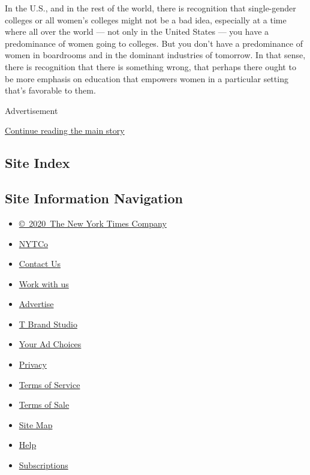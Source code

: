 In the U.S., and in the rest of the world, there is recognition that
single-gender colleges or all women's colleges might not be a bad idea,
especially at a time where all over the world --- not only in the United
States --- you have a predominance of women going to colleges. But you
don't have a predominance of women in boardrooms and in the dominant
industries of tomorrow. In that sense, there is recognition that there
is something wrong, that perhaps there ought to be more emphasis on
education that empowers women in a particular setting that's favorable
to them.

Advertisement

\protect\hyperlink{after-bottom}{Continue reading the main story}

\hypertarget{site-index}{%
\subsection{Site Index}\label{site-index}}

\hypertarget{site-information-navigation}{%
\subsection{Site Information
Navigation}\label{site-information-navigation}}

\begin{itemize}
\tightlist
\item
  \href{https://help.nytimes3xbfgragh.onion/hc/en-us/articles/115014792127-Copyright-notice}{©~2020~The
  New York Times Company}
\end{itemize}

\begin{itemize}
\tightlist
\item
  \href{https://www.nytco.com/}{NYTCo}
\item
  \href{https://help.nytimes3xbfgragh.onion/hc/en-us/articles/115015385887-Contact-Us}{Contact
  Us}
\item
  \href{https://www.nytco.com/careers/}{Work with us}
\item
  \href{https://nytmediakit.com/}{Advertise}
\item
  \href{http://www.tbrandstudio.com/}{T Brand Studio}
\item
  \href{https://www.nytimes3xbfgragh.onion/privacy/cookie-policy\#how-do-i-manage-trackers}{Your
  Ad Choices}
\item
  \href{https://www.nytimes3xbfgragh.onion/privacy}{Privacy}
\item
  \href{https://help.nytimes3xbfgragh.onion/hc/en-us/articles/115014893428-Terms-of-service}{Terms
  of Service}
\item
  \href{https://help.nytimes3xbfgragh.onion/hc/en-us/articles/115014893968-Terms-of-sale}{Terms
  of Sale}
\item
  \href{https://spiderbites.nytimes3xbfgragh.onion}{Site Map}
\item
  \href{https://help.nytimes3xbfgragh.onion/hc/en-us}{Help}
\item
  \href{https://www.nytimes3xbfgragh.onion/subscription?campaignId=37WXW}{Subscriptions}
\end{itemize}

